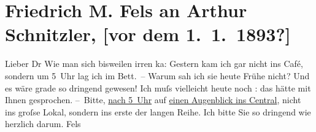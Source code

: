 

         \renewcommand{\erwaehnteOrte}{Orte: Café Central, II., Leopoldstadt, Wien}
         \renewcommand{\erwaehnteWerke}{}
               \section[Friedrich M. Fels an Arthur Schnitzler, {[}vor dem 1. 1. 1893?{]}]{ Friedrich M. Fels an Arthur Schnitzler, {[}vor dem 1. 1. 1893?{]}}\nopagebreak{}\rehead{ }\begin{ledgroupsized}[t]{13cm}\normalsize\beginnumbering \toendnotes[C]{\smallbreak\pagebreak[2]} 
\toendnotes[C]{\smallbreak}\pstart
           \noindent{}{\pb}Lieber Dr \hspace*{1.5em}Wie man sich bisweilen irren ka{\geminationn}: Gestern kam ich gar nicht ins Café, sondern um
                  5 Uhr lag ich im Bett. – Warum sah ich sie heute Frühe nicht? Und es
               wäre grade so dringend gewesen! Ich muſs vielleicht heute noch \label{K_L00152_1v}\label{K_L00152_1h}: das hätte mit Ihnen gesprochen.\pend
           \pstart
           – Bitte, \uline{nach 5 Uhr} auf \uline{einen Augenblick ins Central}, nicht ins groſse Lokal, sondern ins erste der langen Reihe. Ich bitte Sie so
               dringend wie herzlich darum.\pend
           \pstart \spacefill\mbox{Fels}\pend{}
         
         \endnumbering{}\end{ledgroupsized}  \newcommand{\dateiname}{L00152}\newcommand{\titel}{Friedrich M. Fels an Arthur Schnitzler, [vor dem 1. 1. 1893?]}\newcommand{\editorInnen}{Martin Anton Müller und Gerd-Hermann Susen}
      